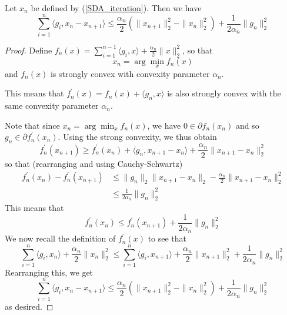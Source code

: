 \begin{lemma}\label{lemma573}
 Let $x_n$ be defined by (\ref{SDA_iteration}). Then we have
 \begin{equation}
  \displaystyle\sum_{i = 1}^n \langle g_i, x_n - x_{n+1}\rangle \leq \frac{\alpha_{n}}{2}(\|x_{n+1}\|_2^2 - \|x_n\|_2^2) + \frac{1}{2\alpha_{n}} \|g_n\|_2^2
 \end{equation}

\end{lemma}
\begin{proof}
 Define $f_n(x) = \sum_{i = 1}^{n-1} \langle g_i, x\rangle + \frac{\alpha_{n}}{2}\|x\|_2^2$, so that
 $$x_n = \arg\min_x f_n(x)
 $$
 and $f_n(x)$ is strongly convex with convexity parameter $\alpha_{n}$.
 
 This means that $f^\prime_n(x) = f_n(x) + \langle g_n, x\rangle$ is also strongly convex with the same convexity parameter $\alpha_{n}$.
 
 Note that since $x_n = \arg\min_x f_n(x)$, we have $0\in \partial f_n(x_n)$ and so $g_n\in \partial f^\prime_n(x_n)$. Using the strong
 convexity, we thus obtain
 \begin{equation}
  f_n^\prime(x_{n+1}) \geq f_n^\prime(x_n) + \langle g_n, x_{n+1} - x_n\rangle + \frac{\alpha_{n}}{2}\|x_{n+1} - x_n\|_2^2
 \end{equation}
 so that (rearranging and using Cauchy-Schwartz)
 \begin{align}
  f_n^\prime(x_n) - f_n^\prime(x_{n+1}) &\leq \|g_n\|_2\|x_{n+1} - x_n\|_2 - \frac{\alpha_{n}}{2}\|x_{n+1} - x_n\|_2^2 \\
  &\leq \frac{1}{2\alpha_{n}} \|g_n\|_2^2
 \end{align}
 This means that
 \begin{equation}
  f_n^\prime(x_n) \leq f_n^\prime(x_{n+1}) + \frac{1}{2\alpha_{n}} \|g_n\|_2^2
 \end{equation}
 We now recall the definition of $f^\prime_n(x)$ to see that
 \begin{equation}
  \displaystyle\sum_{i = 1}^{n} \langle g_i, x_n\rangle + \frac{\alpha_{n}}{2}\|x_n\|_2^2 \leq 
  \displaystyle\sum_{i = 1}^{n} \langle g_i, x_{n+1}\rangle + \frac{\alpha_{n}}{2}\|x_{n+1}\|_2^2 + \frac{1}{2\alpha_{n}} \|g_n\|_2^2
 \end{equation}
 Rearranging this, we get
 \begin{equation}
  \displaystyle\sum_{i = 1}^{n} \langle g_i, x_n - x_{n+1}\rangle \leq \frac{\alpha_{n}}{2}(\|x_{n+1}\|_2^2 - \|x_n\|_2^2) + \frac{1}{2\alpha_{n}} \|g_n\|_2^2
 \end{equation}
 as desired.

\end{proof}

